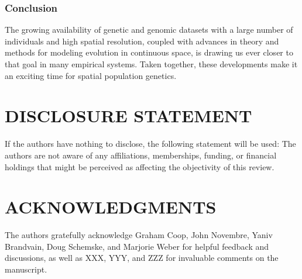 \documentclass{ar-1col}
\newcommand{\g}[1]{{\color{blue}{#1}}}
\begin{document}
\subsubsection{Conclusion}
\g{The field of spatial population genetics is the study of population genetics, in space. 
That is, the principal goals of population genetics -- 
to study patterns of genetic variation and 
learn about the processes generating those patterns 
-- are the same as those of spatial population genetics. 
However, spatial population genetics as a field 
is particularly concerned with the spatial context of these patterns, 
leveraging information in the position of samples 
to learn about processes governing 
the distribution of genetic diversity across landscapes. 
Spatial population genetics allows researchers to 
unite the quantitative descriptions of population genetics 
with fundamental questions about the ecology and evolution of organisms.}
The growing availability of genetic and genomic datasets 
with a large number of individuals and high spatial resolution, 
coupled with advances in theory and methods 
for modeling evolution in continuous space, 
is drawing us ever closer to that goal in many empirical systems.
Taken together, these developments make it 
an exciting time for spatial population genetics.



\section*{DISCLOSURE STATEMENT}
If the authors have nothing to disclose, the following statement will be used: 
The authors are not aware of any affiliations, memberships, funding, or financial holdings 
that might be perceived as affecting the objectivity of this review.

\section*{ACKNOWLEDGMENTS}
The authors gratefully acknowledge 
Graham Coop, John Novembre, 
Yaniv Brandvain, Doug Schemske, and Marjorie Weber 
for helpful feedback and discussions, 
as well as XXX, YYY, and ZZZ for invaluable comments on the manuscript.



\end{document}
